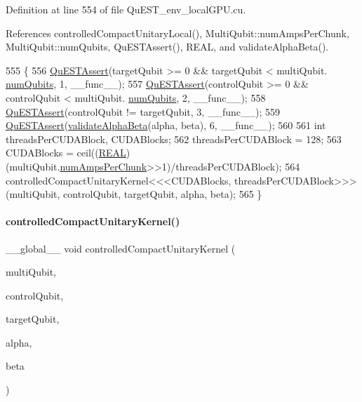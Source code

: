Definition at line 554 of file Qu\+E\+S\+T\+\_\+env\+\_\+local\+G\+P\+U.\+cu.



References controlled\+Compact\+Unitary\+Local(), Multi\+Qubit\+::num\+Amps\+Per\+Chunk, Multi\+Qubit\+::num\+Qubits, Qu\+E\+S\+T\+Assert(), R\+E\+AL, and validate\+Alpha\+Beta().


\begin{DoxyCode}
555 \{
556     \mbox{\hyperlink{QuEST__env__localGPU_8cu_a3587b9d533e633ccf1abf9ad2ce45d8d}{QuESTAssert}}(targetQubit >= 0 && targetQubit < multiQubit.
      \mbox{\hyperlink{structMultiQubit_ab5b9795bdc6fb5855e1974dcbbaeb36f}{numQubits}}, 1, \_\_func\_\_);
557     \mbox{\hyperlink{QuEST__env__localGPU_8cu_a3587b9d533e633ccf1abf9ad2ce45d8d}{QuESTAssert}}(controlQubit >= 0 && controlQubit < multiQubit.
      \mbox{\hyperlink{structMultiQubit_ab5b9795bdc6fb5855e1974dcbbaeb36f}{numQubits}}, 2, \_\_func\_\_);
558     \mbox{\hyperlink{QuEST__env__localGPU_8cu_a3587b9d533e633ccf1abf9ad2ce45d8d}{QuESTAssert}}(controlQubit != targetQubit, 3, \_\_func\_\_);
559     \mbox{\hyperlink{QuEST__env__localGPU_8cu_a3587b9d533e633ccf1abf9ad2ce45d8d}{QuESTAssert}}(\mbox{\hyperlink{QuEST_8c_ae2b2c14a07dd7d50ff86032a3ca101d7}{validateAlphaBeta}}(alpha, beta), 6, \_\_func\_\_);
560 
561     \textcolor{keywordtype}{int} threadsPerCUDABlock, CUDABlocks;
562     threadsPerCUDABlock = 128;
563     CUDABlocks = ceil((\mbox{\hyperlink{QuEST__precision_8h_a4b654506f18b8bfd61ad2a29a7e38c25}{REAL}})(multiQubit.\mbox{\hyperlink{structMultiQubit_a1cad83601a78635dd278259c7ed54f18}{numAmpsPerChunk}}>>1)/threadsPerCUDABlock);
564     controlledCompactUnitaryKernel<<<CUDABlocks, threadsPerCUDABlock>>>(multiQubit, controlQubit, 
      targetQubit, alpha, beta);
565 \}
\end{DoxyCode}
\mbox{\label{QuEST__env__localGPU_8cu_ac9af28ce6412c545805c6275ad7636d5}} 
\paragraph{\texorpdfstring{controlled\+Compact\+Unitary\+Kernel()}{controlledCompactUnitaryKernel()}}
{\footnotesize\ttfamily \+\_\+\+\_\+global\+\_\+\+\_\+ void controlled\+Compact\+Unitary\+Kernel (\begin{DoxyParamCaption}\item[{\mbox{\hyperlink{structMultiQubit}{Multi\+Qubit}}}]{multi\+Qubit,  }\item[{const int}]{control\+Qubit,  }\item[{const int}]{target\+Qubit,  }\item[{\mbox{\hyperlink{structComplex}{Complex}}}]{alpha,  }\item[{\mbox{\hyperlink{structComplex}{Complex}}}]{beta }\end{DoxyParamCaption})}

